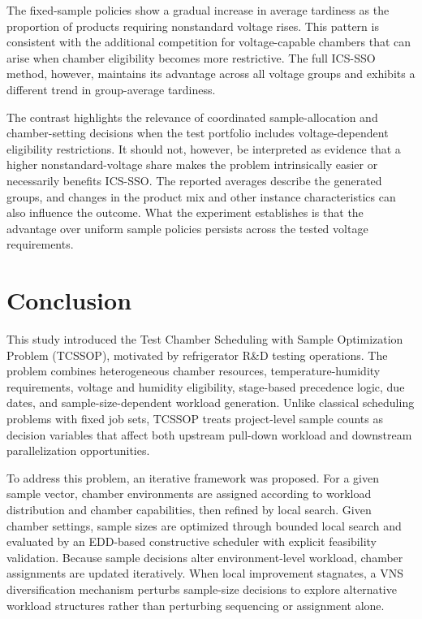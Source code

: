 \documentclass[11pt]{article}
\begin{document}
The fixed-sample policies show a gradual increase in average tardiness as the proportion of products requiring nonstandard voltage rises. This pattern is consistent with the additional competition for voltage-capable chambers that can arise when chamber eligibility becomes more restrictive. The full ICS-SSO method, however, maintains its advantage across all voltage groups and exhibits a different trend in group-average tardiness.

The contrast highlights the relevance of coordinated sample-allocation and chamber-setting decisions when the test portfolio includes voltage-dependent eligibility restrictions. It should not, however, be interpreted as evidence that a higher nonstandard-voltage share makes the problem intrinsically easier or necessarily benefits ICS-SSO. The reported averages describe the generated groups, and changes in the product mix and other instance characteristics can also influence the outcome. What the experiment establishes is that the advantage over uniform sample policies persists across the tested voltage requirements.

\section{Conclusion}
\label{sec:conclusion}

This study introduced the Test Chamber Scheduling with Sample Optimization Problem (TCSSOP), motivated by refrigerator R\&D testing operations. The problem combines heterogeneous chamber resources, temperature-humidity requirements, voltage and humidity eligibility, stage-based precedence logic, due dates, and sample-size-dependent workload generation. Unlike classical scheduling problems with fixed job sets, TCSSOP treats project-level sample counts as decision variables that affect both upstream pull-down workload and downstream parallelization opportunities.

To address this problem, an iterative framework was proposed. For a given sample vector, chamber environments are assigned according to workload distribution and chamber capabilities, then refined by local search. Given chamber settings, sample sizes are optimized through bounded local search and evaluated by an EDD-based constructive scheduler with explicit feasibility validation. Because sample decisions alter environment-level workload, chamber assignments are updated iteratively. When local improvement stagnates, a VNS diversification mechanism perturbs sample-size decisions to explore alternative workload structures rather than perturbing sequencing or assignment alone.
\end{document}
